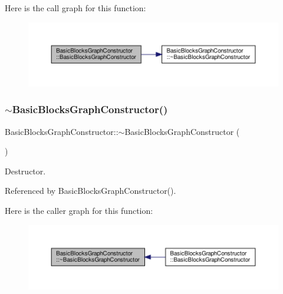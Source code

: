 Here is the call graph for this function\+:
\nopagebreak
\begin{figure}[H]
\begin{center}
\leavevmode
\includegraphics[width=350pt]{d6/d91/classBasicBlocksGraphConstructor_a322811f80dc48d4aa33e5e94381876f1_cgraph}
\end{center}
\end{figure}
\mbox{\label{classBasicBlocksGraphConstructor_aa430cf8dac4feace5513ed2e55015380}} 
\subsubsection{\texorpdfstring{$\sim$\+Basic\+Blocks\+Graph\+Constructor()}{~BasicBlocksGraphConstructor()}}
{\footnotesize\ttfamily Basic\+Blocks\+Graph\+Constructor\+::$\sim$\+Basic\+Blocks\+Graph\+Constructor (\begin{DoxyParamCaption}{ }\end{DoxyParamCaption})\hspace{0.3cm}{\ttfamily [default]}}



Destructor. 



Referenced by Basic\+Blocks\+Graph\+Constructor().

Here is the caller graph for this function\+:
\nopagebreak
\begin{figure}[H]
\begin{center}
\leavevmode
\includegraphics[width=350pt]{d6/d91/classBasicBlocksGraphConstructor_aa430cf8dac4feace5513ed2e55015380_icgraph}
\end{center}
\end{figure}


